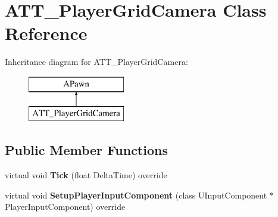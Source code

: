 \hypertarget{class_a_t_t___player_grid_camera}{}\section{A\+T\+T\+\_\+\+Player\+Grid\+Camera Class Reference}
\label{class_a_t_t___player_grid_camera}
Inheritance diagram for A\+T\+T\+\_\+\+Player\+Grid\+Camera\+:\begin{figure}[H]
\begin{center}
\leavevmode
\includegraphics[height=2.000000cm]{class_a_t_t___player_grid_camera}
\end{center}
\end{figure}
\subsection*{Public Member Functions}
\begin{DoxyCompactItemize}
\item 
\mbox{\label{class_a_t_t___player_grid_camera_a69134dc801e23bdcdb1cb065a80e9769}} 
virtual void {\bfseries Tick} (float Delta\+Time) override
\item 
\mbox{\label{class_a_t_t___player_grid_camera_a2ca56f44eba6e5ce19650dbc40f1af18}} 
virtual void {\bfseries Setup\+Player\+Input\+Component} (class U\+Input\+Component $\ast$Player\+Input\+Component) override
\end{DoxyCompactItemize}
